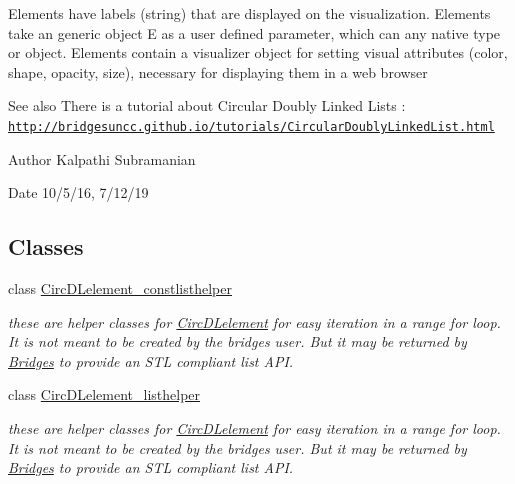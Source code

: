 Elements have labels (string) that are displayed on the visualization. Elements take an generic object E as a user defined parameter, which can any native type or object. Elements contain a visualizer object for setting visual attributes (color, shape, opacity, size), necessary for displaying them in a web browser

\begin{DoxySeeAlso}{See also}
There is a tutorial about Circular Doubly Linked Lists \+: \href{http://bridgesuncc.github.io/tutorials/CircularDoublyLinkedList.html}{\tt http\+://bridgesuncc.\+github.\+io/tutorials/\+Circular\+Doubly\+Linked\+List.\+html}
\end{DoxySeeAlso}
\begin{DoxyAuthor}{Author}
Kalpathi Subramanian 
\end{DoxyAuthor}
\begin{DoxyDate}{Date}
10/5/16, 7/12/19 
\end{DoxyDate}
\subsection*{Classes}
\begin{DoxyCompactItemize}
\item 
class \hyperlink{classbridges_1_1datastructure_1_1_circ_d_lelement_1_1_circ_d_lelement__constlisthelper}{Circ\+D\+Lelement\+\_\+constlisthelper}
\begin{DoxyCompactList}\small\item\em these are helper classes for \hyperlink{classbridges_1_1datastructure_1_1_circ_d_lelement}{Circ\+D\+Lelement} for easy iteration in a range for loop. It is not meant to be created by the bridges user. But it may be returned by \hyperlink{classbridges_1_1_bridges}{Bridges} to provide an S\+TL compliant list A\+PI. \end{DoxyCompactList}\item 
class \hyperlink{classbridges_1_1datastructure_1_1_circ_d_lelement_1_1_circ_d_lelement__listhelper}{Circ\+D\+Lelement\+\_\+listhelper}
\begin{DoxyCompactList}\small\item\em these are helper classes for \hyperlink{classbridges_1_1datastructure_1_1_circ_d_lelement}{Circ\+D\+Lelement} for easy iteration in a range for loop. It is not meant to be created by the bridges user. But it may be returned by \hyperlink{classbridges_1_1_bridges}{Bridges} to provide an S\+TL compliant list A\+PI. \end{DoxyCompactList}\end{DoxyCompactItemize}
